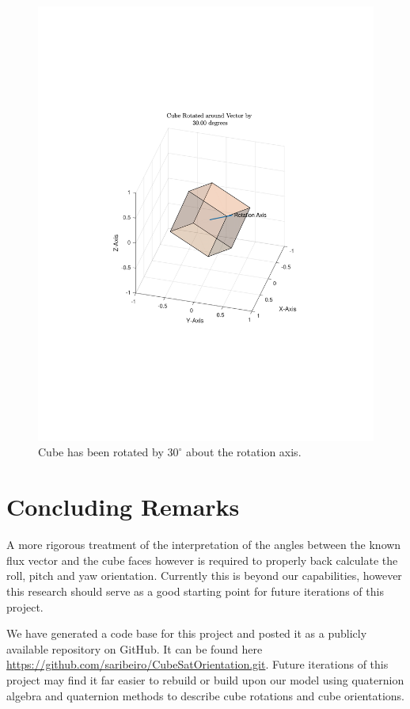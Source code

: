 \documentclass[10pt, letterpaper]{article}
\begin{document}
\begin{figure}[H]
	\centering
	\includegraphics[scale=0.8]{Quaternion_RotatedCube.pdf}
    \caption{Cube has been rotated by $30^{\circ}$ about the rotation axis.}
    \label{fig:Quaternion_RotatedCube}
\end{figure}

\section{Concluding Remarks}

A more rigorous treatment of the interpretation of the angles between the known flux vector and the cube faces however is required to properly back calculate the roll, pitch and yaw orientation. Currently this is beyond our capabilities, however this research should serve as a good starting point for future iterations of this project.

We have generated a code base for this project and posted it as a publicly available repository on GitHub. It can be found here \url{https://github.com/saribeiro/CubeSatOrientation.git}. Future iterations of this project may find it far easier to rebuild or build upon our model using quaternion algebra and quaternion methods to describe cube rotations and cube orientations.
\end{document}
